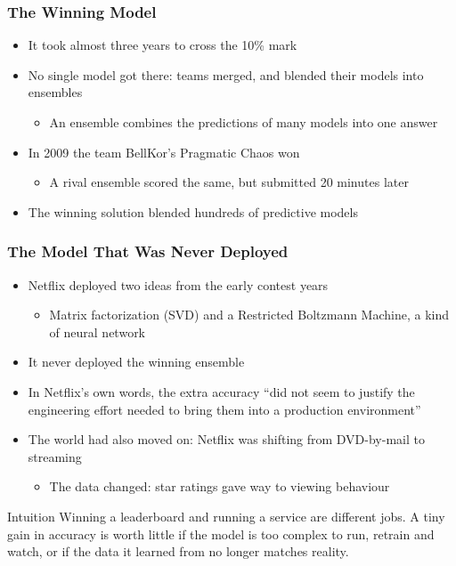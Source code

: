 \begin{frame}[fragile]\frametitle{The Winning Model}
\begin{itemize}
\item It took almost three years to cross the 10\% mark
\item No single model got there: teams merged, and blended their models into ensembles
\begin{itemize}
\item An ensemble combines the predictions of many models into one answer
\end{itemize}
\item In 2009 the team BellKor's Pragmatic Chaos won
\begin{itemize}
\item A rival ensemble scored the same, but submitted 20 minutes later
\end{itemize}
\item The winning solution blended hundreds of predictive models
\end{itemize}
\end{frame}

\begin{frame}[fragile]\frametitle{The Model That Was Never Deployed}
\begin{itemize}
\item Netflix deployed two ideas from the early contest years
\begin{itemize}
\item Matrix factorization (SVD) and a Restricted Boltzmann Machine, a kind of neural network
\end{itemize}
\item It never deployed the winning ensemble
\item In Netflix's own words, the extra accuracy ``did not seem to justify the engineering effort needed to bring them into a production environment''
\item The world had also moved on: Netflix was shifting from DVD-by-mail to streaming
\begin{itemize}
\item The data changed: star ratings gave way to viewing behaviour
\end{itemize}
\end{itemize}

\begin{block}{Intuition}
Winning a leaderboard and running a service are different jobs. A tiny gain in accuracy is worth little
if the model is too complex to run, retrain and watch, or if the data it learned from no longer matches reality.
\end{block}
\end{frame}


